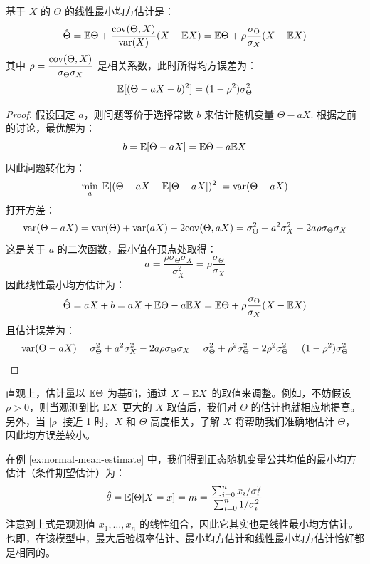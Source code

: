\begin{theorem}[线性最小均方估计]
\label{thm:linear-lms-estimate}
基于 $X$ 的 $\Theta$ 的线性最小均方估计是：
\[
\hat\Theta=\mathbb{E}\Theta+\frac{\mathrm{cov}(\Theta,X)}{\mathrm{var}(X)}(X-\mathbb{E} X)=\mathbb{E}\Theta+\rho\frac{\sigma_\Theta}{\sigma_X}(X-\mathbb{E} X)
\]
其中 $\rho=\dfrac{\mathrm{cov}(\Theta,X)}{\sigma_\Theta\sigma_X}$ 是相关系数，此时所得均方误差为：
\[
\mathbb{E}[(\Theta-aX-b)^2]=(1-\rho^2)\sigma_\Theta^2
\]
\end{theorem}
\begin{proof}
假设固定 $a$，则问题等价于选择常数 $b$ 来估计随机变量 $\Theta-aX$. 根据之前的讨论，最优解为：
\[
b=\mathbb{E}[\Theta-aX]=\mathbb{E}\Theta-a\mathbb{E} X
\]
因此问题转化为：
\[
\min_a\;\mathbb{E}[(\Theta-aX-\mathbb{E}[\Theta-aX])^2]=\mathrm{var}(\Theta-aX)
\]
打开方差：
\[
\mathrm{var}(\Theta-aX)=\mathrm{var}(\Theta)+\mathrm{var}(aX)-2\mathrm{cov}(\Theta,aX)=\sigma_\Theta^2+a^2\sigma_X^2-2a\rho\sigma_\Theta\sigma_X
\]
这是关于 $a$ 的二次函数，最小值在顶点处取得：
\[
a=\frac{\rho\sigma_\Theta\sigma_X}{\sigma_X^2}=\rho\frac{\sigma_\Theta}{\sigma_X}
\]
因此线性最小均方估计为：
\[
\hat\Theta=aX+b=aX+\mathbb{E}\Theta-a\mathbb{E} X=\mathbb{E}\Theta+\rho\frac{\sigma_\Theta}{\sigma_X}(X-\mathbb{E} X)
\]
且估计误差为：
\[
\mathrm{var}(\Theta-aX)=\sigma_\Theta^2+a^2\sigma_X^2-2a\rho\sigma_\Theta\sigma_X=\sigma_\Theta^2+\rho^2\sigma_\Theta^2-2\rho^2\sigma_\Theta^2=(1-\rho^2)\sigma_\Theta^2
\]
\end{proof}
\begin{remark}
直观上，估计量以 $\mathbb{E}\Theta$ 为基础，通过 $X-\mathbb{E} X$ 的取值来调整。例如，不妨假设 $\rho>0$，则当观测到比 $\mathbb{E} X$ 更大的 $X$ 取值后，我们对 $\Theta$ 的估计也就相应地提高。另外，当 $|\rho|$ 接近 1 时，$X$ 和 $\Theta$ 高度相关，了解 $X$ 将帮助我们准确地估计 $\Theta$，因此均方误差较小。
\end{remark}

\begin{example}[正态随机变量公共均值的估计量-续]
在例 \ref{ex:normal-mean-estimate} 中，我们得到正态随机变量公共均值的最小均方估计（条件期望估计）为：
\[
\hat\theta=\mathbb{E}[\Theta\vert X=x]=m=\frac{\sum_{i=0}^nx_i/\sigma_i^2}{\sum_{i=0}^n1/\sigma_i^2}
\]
注意到上式是观测值 $x_1,\ldots,x_n$ 的线性组合，因此它其实也是线性最小均方估计。也即，在该模型中，最大后验概率估计、最小均方估计和线性最小均方估计恰好都是相同的。
\end{example}

